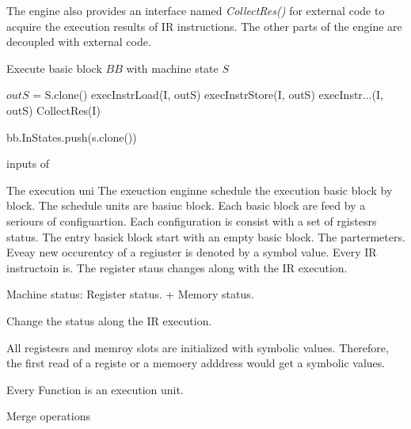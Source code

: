 The engine also provides an interface named \textit{CollectRes()} for external code to acquire
the execution results of IR instructions.
The other parts of the engine are decoupled with external code.


\begin{algorithm}
  \caption{Execute basic block $BB$ with machine state $S$}
  \footnotesize
  \begin{algorithmic}[1]
    \State $outS$ = S.clone()  
    \State execInstrLoad(I, outS) 
    \EndCase
    \State execInstrStore(I, outS)
    \EndCase
    \State execInstr...(I, outS)
    \EndCase
    \EndSwitch
    \State CollectRes(I) 
    \EndFor

    \State
     
     
    \State bb.InStates.push(s.clone())
    \EndFor
    \EndIf

    \EndFunction
  \end{algorithmic}
\end{algorithm}





inputs of

The execution uni
The exeuction enginne schedule the execution basic block by block.
The schedule units are basiuc block.
Each basic block are feed by a seriours of configuartion.
Each configuration is consist with a set of rgistesrs status.
The entry basick block start with an empty basic block.
The partermeters.
Eveay new occurentcy of a regiuster is denoted by a symbol value.
Every IR instructoin is.
The register staus changes along with the IR execution.

Machine status: Register status. + Memory status.

Change the status along the IR execution.

All registesrs and memroy slots are initialized with symbolic values.
Therefore, the first read of a registe or a memoery adddress would get a symbolic values.

Every Function is an execution unit.

Merge operations

